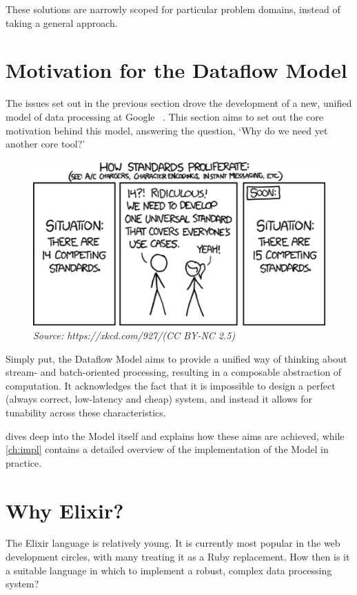 These solutions are narrowly scoped for particular problem domains, instead of taking a general approach.

\section{Motivation for the Dataflow Model}\label{sec:intro:motivation}

The issues set out in the previous section drove the development of a new, unified model of data processing at Google ~\cite{Akidau:2015}.
This section aims to set out the core motivation behind this model, answering the question, `Why do we need yet another core tool?'

\begin{figure}[h]
	\centering
	\includegraphics[width=.75\textwidth]{images/xkcd-standards}
	\caption*{\textit{Source: https://xkcd.com/927/\quad(CC BY-NC 2.5)}}
\end{figure}

Simply put, the Dataflow Model aims to provide a unified way of thinking about stream- and batch-oriented processing, resulting in a composable abstraction of computation.
It acknowledges the fact that it is impossible to design a perfect (always correct, low-latency and cheap) system, and instead it allows for tunability across these characteristics.

 dives deep into the Model itself and explains how these aims are achieved, while \cref{ch:impl} contains a detailed overview of the implementation of the Model in practice.

\section{Why Elixir?}\label{sec:intro:elixir}

The Elixir language \cite{Elixir} is relatively young.
It is currently most popular in the web development circles, with many treating it as a Ruby replacement.
How then is it a suitable language in which to implement a robust, complex data processing system?

